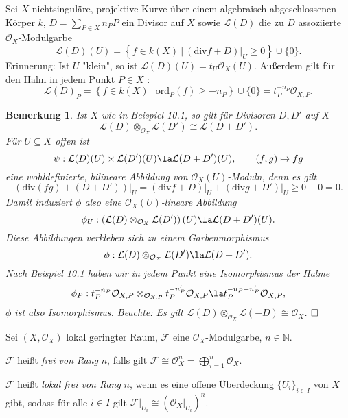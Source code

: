 \documentclass[11pt]{book}
\newtheorem{remark}[theorem]{Bemerkung}
\theoremstyle{nonumberbreak}
\newenvironment{defin}[1][]{\ifthenelse{\equal{#1}{}}{\definition}{\definition[#1]}\rm}{\enddefinition}
\newenvironment{pr}[1][]{\ifthenelse{\equal{#1}{}}{\proof}{\proof[#1]}\rm}{\endproof}
\newenvironment{ex}[1][]{\ifthenelse{\equal{#1}{}}{\example}{\example[#1]}\rm}{\endexample}
\begin{document}
\begin{spacing}{1.4}
\begin{ex} %
Sei $X$ nichtsinguläre, projektive Kurve über einem algebraisch abgeschlossenen Körper $k$, $D= \sum_{P \in X} n_P P$ ein Divisor auf $X$ sowie $\mathcal{L}(D)$ die zu $D$ assoziierte $\mathcal{O}_X$-Modulgarbe
$$\mathcal{L}(D)(U) = \left\{ f \in k(X) \ \vert \ \left( \text{div} f + D \right)\vert_U \geqslant 0 \right\} \cup \{0\}.$$
Erinnerung: Ist $U$ "klein", so ist $\mathcal{L}(D)(U) = t_U \mathcal{O}_X(U)$. Außerdem gilt für den Halm in jedem Punkt $P \in X$ :
$$\mathcal{L}(D)_P = \left\{ f \in k(X) \ \vert \ \text{ord}_P(f) \geqslant -n_P \right\} \cup \{0\} = t_P^{-n_P} \mathcal{O}_{X,P}.$$
\end{ex}





\begin{remark}
Ist $X$ wie in Beispiel 10.1, so gilt für Divisoren $D,D'$ auf $X$
$$\mathcal{L}(D) \otimes_{\mathcal{O}_X} \mathcal{L}(D') \cong \mathcal{L}(D+D').$$
\begin{pr}
Für $U \subseteq X$ offen ist 
$$\psi: \mathcal{L}(D)(U) \times \mathcal{L}(D')(U) \la \mathcal{L}(D+D')(U), \qquad (f,g) \mapsto fg$$
eine wohldefinierte, bilineare Abbildung von $\mathcal{O}_X(U)$-Moduln, denn es gilt 
$$\left( \text{div} (fg) + (D+D') \right) \vert_U = \left( \text{div} f + D \right) \vert_U + \left( \text{div} g + D' \right) \vert_U \geqslant 0 + 0 = 0.$$
Damit induziert $\phi$ also eine $\mathcal{O}_X(U)$-lineare Abbildung
$$\phi_U: \left(\mathcal{L}(D) \otimes_{\mathcal{O}_X} \mathcal{L}(D') \right)(U) \la \mathcal{L}(D+D')(U).$$
Diese Abbildungen verkleben sich zu einem Garbenmorphismus 
$$\phi:\mathcal{L}(D) \otimes_{\mathcal{O}_X} \mathcal{L}(D') \la \mathcal{L}(D+D').$$
Nach Beispiel 10.1 haben wir in jedem Punkt eine Isomorphismus der Halme
$$\phi_P: t_P^{-n_P} \mathcal{O}_{X,P} \otimes_{\mathcal{O}_{X,P}} t_P^{-n_P'} \mathcal{O}_{X,P} \la t_P^{-n_P-n_P'} \mathcal{O}_{X,P},$$
$\phi$ ist also Isomorphismus. Beachte: Es gilt $\mathcal{L}(D) \otimes_{\mathcal{O}_X} \mathcal{L}(-D) \cong \mathcal{O}_X$. $\hfill \Box$
\end{pr}
\end{remark}


\newcommand{\lokring}{(X, \mathcal{O}_X)}
\newcommand{\oxg}{\mathcal{O}_X}


\begin{defin}   %
Sei $\lokring$ lokal geringter Raum, $\mathcal{F}$ eine $\oxg$-Modulgarbe, $n \in \mathbb{N}$.
\begin{compactenum}
\item $\mathcal{F}$ heißt \textit{frei von Rang} $n$, falls gilt $\mathcal{F} \cong \oxg^n = \bigoplus_{i=1}^n \oxg$.
\item $\mathcal{F}$ heißt \textit{lokal frei von Rang} $n$, wenn es eine offene Überdeckung $\{U_i\}_{i\in I}$ von $X$ gibt, sodass für alle $i \in I$ gilt $\mathcal{F}\vert_{U_i} \cong \left( \oxg\vert_{U_i}\right)^n$.
\end{compactenum}


\end{defin}
\end{spacing}
\end{document}
